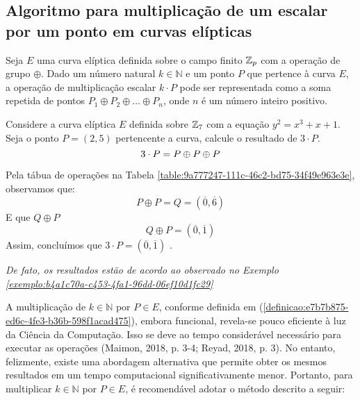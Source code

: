 \subsection{Algoritmo para multiplicação de um escalar por um ponto em curvas elípticas}

\begin{definicao} \label{definicao:e7b7b875-ed6c-4fe3-b36b-598f1acad475}
	Seja $E$ uma curva elíptica definida sobre o campo finito $\mathbb{Z}_p$ com a operação de grupo $\oplus$. Dado um número natural $k \in \mathbb{N}$ e um ponto $P$ que pertence à curva $E$, a operação de multiplicação escalar $k \cdot P$ pode ser representada como a soma repetida de pontos $P_1 \oplus P_2 \oplus \ldots \oplus P_n$, onde $n$ é um número inteiro positivo.
\end{definicao}

\begin{exemplo} \label{exemplo:c6a03a6a-2638-447f-9962-0fa0ea697a7e}

	Considere a curva elíptica $E$ definida sobre $\mathbb{Z}_{7}$ com a equação $y^2 = x^3
		+ x + 1$. Seja o ponto $P = (2, 5)$ pertencente a curva, calcule o resultado de
	$3 \cdot P$.
	\begin{equation}
		3 \cdot P  = P \oplus P \oplus P \nonumber    \\
	\end{equation}

	\justify
	Pela tábua de operações  na Tabela \ref{table:9a777247-111c-46c2-bd75-34f49e963e3e}, observamos que:
	\begin{equation}
		P \oplus P  = Q = (\overline{0},\overline{6}) \nonumber
	\end{equation}
	\justify
	E que $Q \oplus P$
	\begin{equation}
		Q \oplus P = (\overline{0},\overline{1}) \nonumber
	\end{equation}
	\justify
	Assim, concluímos que $ 3 \cdot P = (\overline{0},\overline{1}) $ .

	\justify
	\textit{De fato, os resultados estão de acordo ao observado no Exemplo  \ref{exemplo:b4a1c70a-c453-4fa1-96dd-06ef10d1fc29} }
\end{exemplo}

A multiplicação de $k \in \mathbb{N}$ por $P \in E$, conforme definida em
(\ref{definicao:e7b7b875-ed6c-4fe3-b36b-598f1acad475}), embora funcional,
revela-se pouco eficiente à luz da Ciência da Computação. Isso se deve ao tempo
considerável necessário para executar as operações (Maimon, 2018, p. 3-4;
Reyad, 2018, p. 3). No entanto, felizmente, existe uma abordagem alternativa
que permite obter os mesmos resultados em um tempo computacional
significativamente menor. Portanto, para multiplicar $k \in \mathbb{N}$ por $P
	\in E$, é recomendável adotar o método descrito a seguir:

